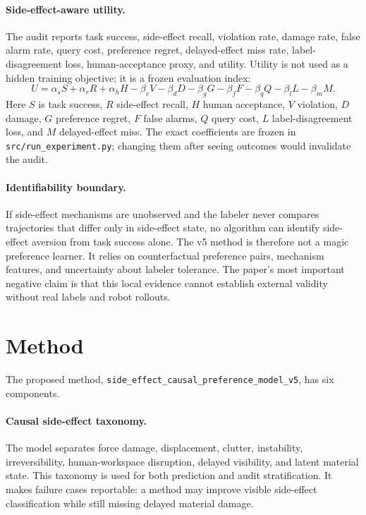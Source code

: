 \documentclass{article}
\begin{document}
\paragraph{Side-effect-aware utility.}
The audit reports task success, side-effect recall, violation rate, damage rate, false alarm rate, query cost, preference regret, delayed-effect miss rate, label-disagreement loss, human-acceptance proxy, and utility. Utility is not used as a hidden training objective; it is a frozen evaluation index:
\[
U = \alpha_s S + \alpha_r R + \alpha_h H - \beta_v V - \beta_d D - \beta_g G - \beta_f F - \beta_q Q - \beta_l L - \beta_m M.
\]
Here $S$ is task success, $R$ side-effect recall, $H$ human acceptance, $V$ violation, $D$ damage, $G$ preference regret, $F$ false alarms, $Q$ query cost, $L$ label-disagreement loss, and $M$ delayed-effect miss. The exact coefficients are frozen in \texttt{src/run\_experiment.py}; changing them after seeing outcomes would invalidate the audit.

\paragraph{Identifiability boundary.}
If side-effect mechanisms are unobserved and the labeler never compares trajectories that differ only in side-effect state, no algorithm can identify side-effect aversion from task success alone. The v5 method is therefore not a magic preference learner. It relies on counterfactual preference pairs, mechanism features, and uncertainty about labeler tolerance. The paper's most important negative claim is that this local evidence cannot establish external validity without real labels and robot rollouts.

\section{Method}
The proposed method, \texttt{side\_effect\_causal\_preference\_model\_v5}, has six components.

\paragraph{Causal side-effect taxonomy.}
The model separates force damage, displacement, clutter, instability, irreversibility, human-workspace disruption, delayed visibility, and latent material state. This taxonomy is used for both prediction and audit stratification. It makes failure cases reportable: a method may improve visible side-effect classification while still missing delayed material damage.
\end{document}

